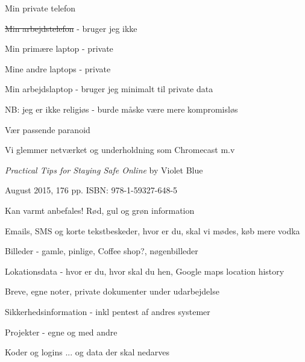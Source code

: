 \documentclass[18pt,landscape,a4paper,footrule]{foils}
\begin{document}

\begin{list2}
\item Min private telefon
\item \sout{Min arbejdstelefon} - bruger jeg ikke
\item Min primære laptop - private
\item Mine andre laptops - private
\item Min arbejdslaptop - bruger jeg minimalt til private data

\item NB: jeg er ikke religiøs - burde måske være mere kompromisløs
\item Vær passende paranoid
\end{list2}

\centerline{Vi glemmer netværket og underholdning som Chromecast m.v}






\emph{Practical Tips for Staying Safe Online}
by Violet Blue

August 2015, 176 pp.
ISBN: 978-1-59327-648-5

Kan varmt anbefales! Rød, gul og grøn information




\begin{list2}
\item Emails, SMS og korte tekstbeskeder, hvor er du, skal vi mødes, køb mere vodka
\item Billeder - gamle, pinlige, Coffee shop?, nøgenbilleder
\item Lokationsdata - hvor er du, hvor skal du hen, Google maps location history
\item Breve, egne noter, private dokumenter under udarbejdelse
\item Sikkerhedsinformation - inkl pentest af andres systemer
\item Projekter - egne og med andre
\item Koder og logins ... og data der skal nedarves
\end{list2}

\end{document}
